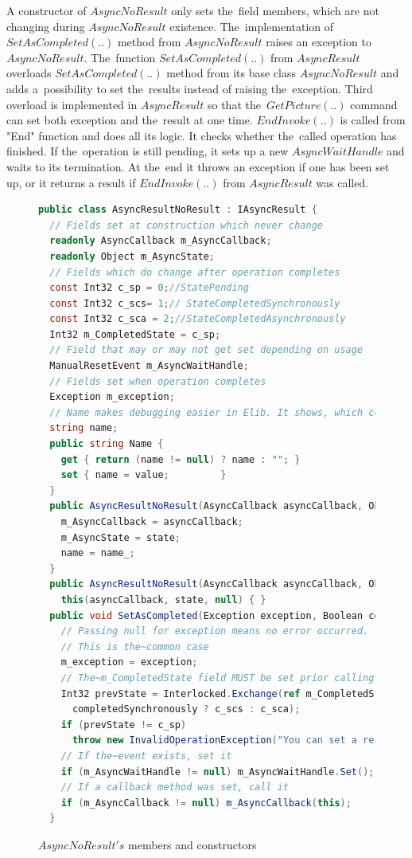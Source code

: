  \begin{remark}
  A constructor of $AsyncNoResult$ only sets the~field members, 
  which are not changing during $AsyncNoResult$ existence.
  The~implementation of $SetAsCompleted(..)$ method 
  from $AsyncNoResult$ raises an exception to $AsyncNoResult$.
  The~function $SetAsCompleted(..)$ from $AsyncResult$ overloads $SetAsCompleted(..)$ method
  from its base class $AsyncNoResult$ and adds 
  a~possibility to set the~results instead of raising the~exception.
  Third overload is implemented in $AsyncResult$ so that the~$GetPicture(..)$ 
  command can set both exception and the~result at one time.
  $EndInvoke(..)$ is called from "End" function and does all its logic. 
  It checks whether the~called operation has finished.
  If the~operation is still pending, it sets up a new $AsyncWaitHandle$
  and waits to its termination. At the~end it throws an exception if one has been set up, 
  or it returns a result if $EndInvoke(..)$ from $AsyncResult$ was called.
  \end{remark}

\begin{figure}[!hbp]	
\begin{lstlisting}[language=cs]
public class AsyncResultNoResult : IAsyncResult {
  // Fields set at construction which never change 
  readonly AsyncCallback m_AsyncCallback;
  readonly Object m_AsyncState;
  // Fields which do change after operation completes
  const Int32 c_sp = 0;//StatePending
  const Int32 c_scs= 1;// StateCompletedSynchronously
  const Int32 c_sca = 2;//StateCompletedAsynchronously
  Int32 m_CompletedState = c_sp;
  // Field that may or may not get set depending on usage
  ManualResetEvent m_AsyncWaitHandle;
  // Fields set when operation completes
  Exception m_exception;
  // Name makes debugging easier in Elib. It shows, which command was used.
  string name;
  public string Name { 
    get { return (name != null) ? name : ""; } 
    set { name = value; 		} 
  }
  public AsyncResultNoResult(AsyncCallback asyncCallback, Object state, string name_) {
    m_AsyncCallback = asyncCallback;
    m_AsyncState = state;
    name = name_;
  }
  public AsyncResultNoResult(AsyncCallback asyncCallback, Object state) : 
    this(asyncCallback, state, null) { }
  public void SetAsCompleted(Exception exception, Boolean completedSynchronously) {
    // Passing null for exception means no error occurred. 
    // This is the~common case
    m_exception = exception;
    // The~m_CompletedState field MUST be set prior calling the~callback
    Int32 prevState = Interlocked.Exchange(ref m_CompletedState, 
      completedSynchronously ? c_scs : c_sca);
    if (prevState != c_sp)
      throw new InvalidOperationException("You can set a result only once");
    // If the~event exists, set it
    if (m_AsyncWaitHandle != null) m_AsyncWaitHandle.Set();
    // If a callback method was set, call it
    if (m_AsyncCallback != null) m_AsyncCallback(this);
  }
\end{lstlisting}
\caption{$AsyncNoResult's$ members and constructors} 
\label{noresult}
\end{figure}



